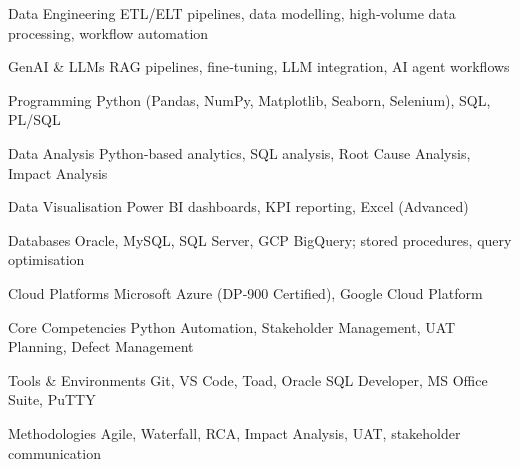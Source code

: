 
\begin{cvskillsnoncentered}

  \cvskill
    {Data Engineering}
    {ETL/ELT pipelines, data modelling, high‑volume data processing, workflow automation}

  \cvskill
    {GenAI \& LLMs}
    {RAG pipelines, fine‑tuning, LLM integration, AI agent workflows}

  \cvskill
    {Programming}
    {Python (Pandas, NumPy, Matplotlib, Seaborn, Selenium), SQL, PL/SQL}

  \cvskill
    {Data Analysis}
    {Python-based analytics, SQL analysis, Root Cause Analysis, Impact Analysis}

  \cvskill
    {Data Visualisation}
    {Power BI dashboards, KPI reporting, Excel (Advanced)}

  \cvskill
    {Databases}
    {Oracle, MySQL, SQL Server, GCP BigQuery; stored procedures, query optimisation}

  \cvskill
    {Cloud Platforms}
    {Microsoft Azure (DP‑900 Certified), Google Cloud Platform}

  \cvskill
    {Core Competencies}
    {Python Automation, Stakeholder Management, UAT Planning, Defect Management}

  \cvskill
    {Tools \& Environments}
    {Git, VS Code, Toad, Oracle SQL Developer, MS Office Suite, PuTTY}

  \cvskill
    {Methodologies}
    {Agile, Waterfall, RCA, Impact Analysis, UAT, stakeholder communication}

\end{cvskillsnoncentered}
